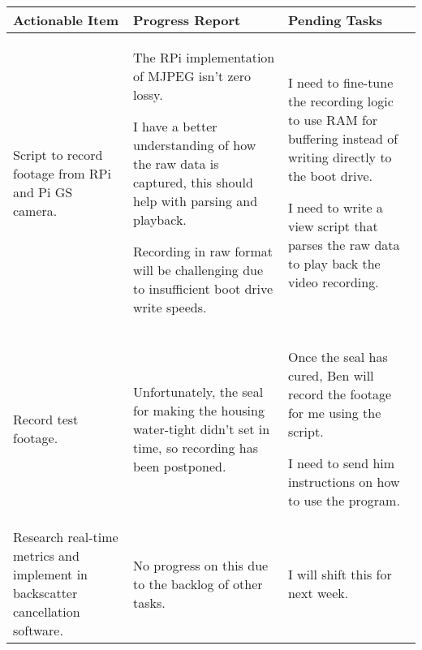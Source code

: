 \begin{table}[!h]
    \centering
    \begin{tabularx}{\textwidth}{|X|X|X|}
        \hline
        Actionable Item & Progress Report & Pending Tasks \\
        \hline
        \hline
        Script to record footage from RPi and Pi GS camera. & 
        \begin{myitemize}
            \item The RPi implementation of MJPEG isn't zero lossy.
            \item I have a better understanding of how the raw data is captured, this should help with parsing and playback.
            \item Recording in raw format will be challenging due to insufficient boot drive write speeds.
        \end{myitemize} & 
        \begin{myitemize}
            \item I need to fine-tune the recording logic to use RAM for buffering instead of writing directly to the boot drive.
            \item I need to write a view script that parses the raw data to play back the video recording.
        \end{myitemize} \\
        \hline
        Record test footage. & 
        \begin{myitemize}
            \item Unfortunately, the seal for making the housing water-tight didn't set in time, so recording has been postponed.
        \end{myitemize} & 
        \begin{myitemize}
            \item Once the seal has cured, Ben will record the footage for me using the script.
            \item I need to send him instructions on how to use the program.
        \end{myitemize} \\
        \hline
        Research real-time metrics and implement in backscatter cancellation software. &
        \begin{myitemize}
            \item No progress on this due to the backlog of other tasks.
        \end{myitemize} & 
        \begin{myitemize}
            \item I will shift this for next week.
        \end{myitemize} \\
        \hline
    \end{tabularx}
\end{table}
